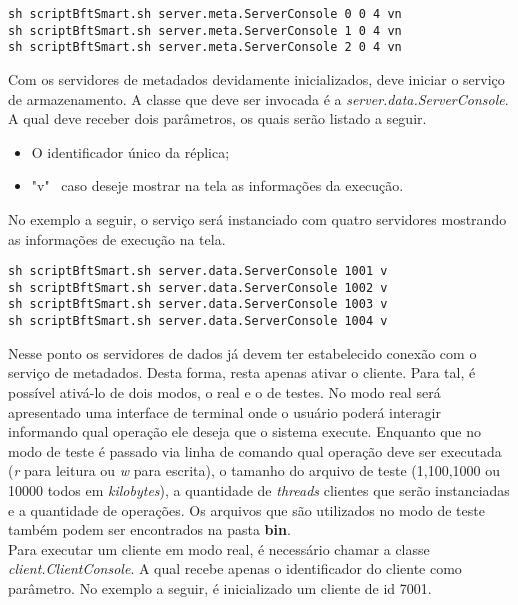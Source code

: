 \begin{lstlisting}
sh scriptBftSmart.sh server.meta.ServerConsole 0 0 4 vn
sh scriptBftSmart.sh server.meta.ServerConsole 1 0 4 vn
sh scriptBftSmart.sh server.meta.ServerConsole 2 0 4 vn
\end{lstlisting}

Com os servidores de metadados devidamente inicializados, deve iniciar o serviço de armazenamento. A classe que deve ser invocada é a \textit{server.data.ServerConsole}. A qual deve receber dois parâmetros, os quais serão listado a seguir. 
\\

\begin{itemize}
	\item O identificador único da réplica;
	\item "v" ~caso deseje mostrar na tela as informações da execução.
\end{itemize}

No exemplo a seguir, o serviço será instanciado com quatro servidores mostrando as informações de execução na tela.
\\

\begin{lstlisting}
sh scriptBftSmart.sh server.data.ServerConsole 1001 v
sh scriptBftSmart.sh server.data.ServerConsole 1002 v
sh scriptBftSmart.sh server.data.ServerConsole 1003 v
sh scriptBftSmart.sh server.data.ServerConsole 1004 v
\end{lstlisting}

Nesse ponto os servidores de dados já devem ter estabelecido conexão com o serviço de metadados. Desta forma, resta apenas ativar o cliente. Para tal, é possível ativá-lo de dois modos, o real e o de testes. No modo real será apresentado uma interface de terminal onde o usuário poderá interagir informando qual operação ele deseja que o sistema execute. Enquanto que no modo de teste é passado via linha de comando qual operação deve ser executada (\textit{r} para leitura ou \textit{w} para escrita), o tamanho do arquivo de teste (1,100,1000 ou 10000 todos em \textit{kilobytes}), a quantidade de \textit{threads} clientes que serão instanciadas e a quantidade de operações. Os arquivos que são utilizados no modo de teste também podem ser encontrados na pasta \textbf{bin}.
\\

Para executar um cliente em modo real, é necessário chamar a classe \textit{client.ClientConsole}. A qual recebe apenas o identificador do cliente como parâmetro. No exemplo a seguir, é inicializado um cliente de id 7001.
\\

